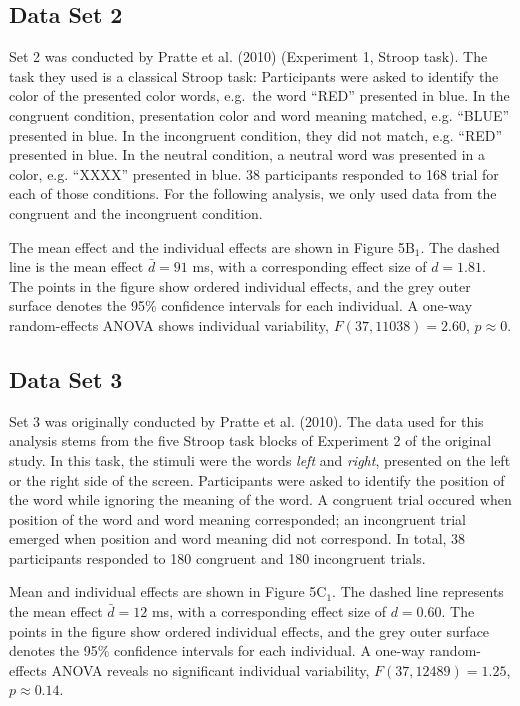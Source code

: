 \documentclass[american,man]{apa6}
\begin{document}
\subsection{Data Set 2}\label{data-set-2}

Set 2 was conducted by Pratte et al. (2010) (Experiment 1, Stroop task).
The task they used is a classical Stroop task: Participants were asked
to identify the color of the presented color words, e.g.~the word
\enquote{RED} presented in blue. In the congruent condition,
presentation color and word meaning matched, e.g. \enquote{BLUE}
presented in blue. In the incongruent condition, they did not match,
e.g. \enquote{RED} presented in blue. In the neutral condition, a
neutral word was presented in a color, e.g. \enquote{XXXX} presented in
blue. 38 participants responded to 168 trial for each of those
conditions. For the following analysis, we only used data from the
congruent and the incongruent condition.

The mean effect and the individual effects are shown in Figure
5\(\mbox{B}_1\). The dashed line is the mean effect \(\bar{d} = 91\) ms,
with a corresponding effect size of \(d = 1.81\). The points in the
figure show ordered individual effects, and the grey outer surface
denotes the 95\% confidence intervals for each individual. A one-way
random-effects ANOVA shows individual variability,
\(F(37, 11038) = 2.60\), \(p \approx 0\).

\subsection{Data Set 3}\label{data-set-3}

Set 3 was originally conducted by Pratte et al. (2010). The data used
for this analysis stems from the five Stroop task blocks of Experiment 2
of the original study. In this task, the stimuli were the words
\emph{left} and \emph{right}, presented on the left or the right side of
the screen. Participants were asked to identify the position of the word
while ignoring the meaning of the word. A congruent trial occured when
position of the word and word meaning corresponded; an incongruent trial
emerged when position and word meaning did not correspond. In total, 38
participants responded to 180 congruent and 180 incongruent trials.

Mean and individual effects are shown in Figure 5\(\mbox{C}_1\). The
dashed line represents the mean effect \(\bar{d} = 12\) ms, with a
corresponding effect size of \(d = 0.60\). The points in the figure show
ordered individual effects, and the grey outer surface denotes the 95\%
confidence intervals for each individual. A one-way random-effects ANOVA
reveals no significant individual variability, \(F(37, 12489) = 1.25\),
\(p \approx 0.14\).
\end{document}
